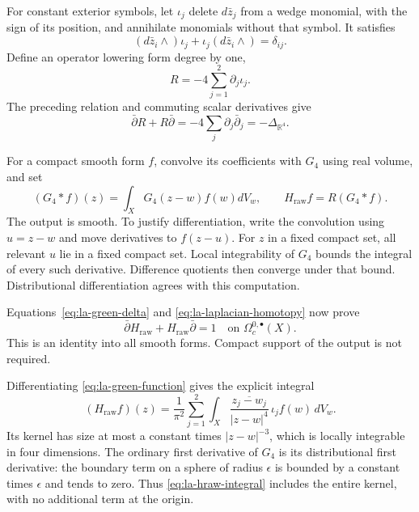 For constant exterior symbols, let $\iota_j$ delete
$d\bar z_j$ from a wedge monomial, with the sign of its
position, and annihilate monomials without that symbol.
It satisfies
\[
 (d\bar z_i\wedge)\iota_j
       +\iota_j(d\bar z_i\wedge)=\delta_{ij}.
\]
Define an operator lowering form degree by one,
\[
 R=-4\sum_{j=1}^2\partial_j\iota_j.
\]
The preceding relation and commuting scalar derivatives give
\begin{equation}\label{eq:la-laplacian-homotopy}
 \bar\partial R+R\bar\partial
 =-4\sum_j\partial_j\bar\partial_j
 =-\Delta_{\mathbb R^4}.
\end{equation}

For a compact smooth form $f$, convolve its coefficients with
$G_4$ using real volume, and set
\begin{equation}\label{eq:la-hraw}
 (G_4*f)(z)=\int_XG_4(z-w)f(w)dV_w,
 \qquad H_{\mathrm{raw}}f=R(G_4*f).
\end{equation}
The output is smooth. To justify differentiation, write the
convolution using $u=z-w$ and move derivatives to $f(z-u)$.
For $z$ in a fixed compact set, all relevant $u$ lie in a
fixed compact set. Local integrability of $G_4$ bounds the
integral of every such derivative. Difference quotients then
converge under that bound. Distributional differentiation
agrees with this computation.

Equations~\eqref{eq:la-green-delta} and
\eqref{eq:la-laplacian-homotopy} now prove
\begin{equation}\label{eq:la-homotopy-raw}
 \bar\partial H_{\mathrm{raw}}
       +H_{\mathrm{raw}}\bar\partial=1
 \quad\text{on }\Omega_c^{0,\bullet}(X).
\end{equation}
This is an identity into all smooth forms. Compact support of
the output is not required.

Differentiating \eqref{eq:la-green-function} gives the explicit
integral
\begin{equation}\label{eq:la-hraw-integral}
 (H_{\mathrm{raw}}f)(z)
 =\frac1{\pi^2}\sum_{j=1}^2
      \int_X\frac{\overline{z_j-w_j}}{|z-w|^4}\,
                    \iota_jf(w)\,dV_w.
\end{equation}
Its kernel has size at most a constant times $|z-w|^{-3}$,
which is locally integrable in four dimensions. The ordinary
first derivative of $G_4$ is its distributional first
derivative: the boundary term on a sphere of radius
$\epsilon$ is bounded by a constant times $\epsilon$ and
tends to zero. Thus \eqref{eq:la-hraw-integral} includes the
entire kernel, with no additional term at the origin.

